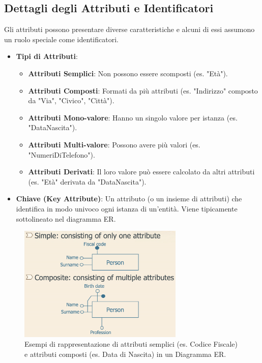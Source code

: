 \subsection{Dettagli degli Attributi e Identificatori}
Gli attributi possono presentare diverse caratteristiche e alcuni di essi assumono un ruolo speciale come identificatori.
\begin{itemize}
    \item \textbf{Tipi di Attributi}:
    \begin{itemize}
        \item \textbf{Attributi Semplici}: Non possono essere scomposti (es. "Età").
        \item \textbf{Attributi Composti}: Formati da più attributi (es. "Indirizzo" composto da "Via", "Civico", "Città").
        \item \textbf{Attributi Mono-valore}: Hanno un singolo valore per istanza (es. "DataNascita").
        \item \textbf{Attributi Multi-valore}: Possono avere più valori (es. "NumeriDiTelefono").
        \item \textbf{Attributi Derivati}: Il loro valore può essere calcolato da altri attributi (es. "Età" derivata da "DataNascita").
    \end{itemize}
    \item \textbf{Chiave (Key Attribute)}: Un attributo (o un insieme di attributi) che identifica in modo univoco ogni istanza di un'entità. Viene tipicamente sottolineato nel diagramma ER.
\end{itemize}

\begin{figure}[h!]
    \centering
    \includegraphics[width=0.7\textwidth]{immagini/er_attributi_semplici_composti.png} 
    \caption{Esempi di rappresentazione di attributi semplici (es. Codice Fiscale) e attributi composti (es. Data di Nascita) in un Diagramma ER.}
    \label{fig:er_attributi_semplici_composti}
\end{figure}


